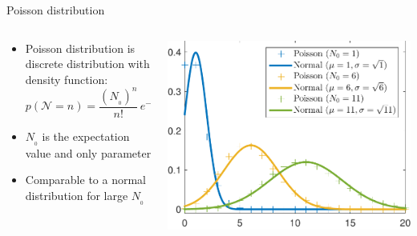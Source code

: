 \begin{frame}{Poisson distribution}

    \begin{columns}[c, onlytextwidth]
        \begin{column}{0.4\textwidth}
            \begin{itemize}
                \item Poisson distribution is discrete distribution with density function:
                      \begin{equation*}
                          p(\mathcal{N}=n)=\frac{(N_{_0})^n}{n!}\,e^{-N_{_0}}
                      \end{equation*}
                \item $N_{_0}$ is the expectation value and only parameter
                \item Comparable to a normal distribution for large $N_{_0}$
            \end{itemize}
        \end{column}\begin{column}{0.6\textwidth}
            \begin{center}
                \includegraphics[height=0.7\textheight]{images/PoissoinVsGauss}%
            \end{center}
        \end{column}
    \end{columns}
\end{frame}

